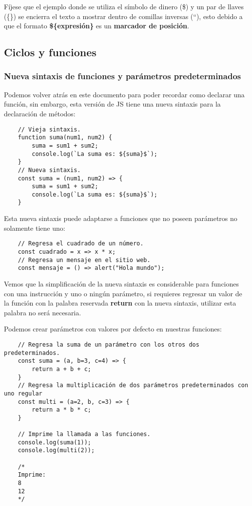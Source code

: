 Fíjese que el ejemplo donde se utiliza el símbolo de dinero (\$) y un par de llaves (\{\}) se encierra el texto a mostrar dentro de comillas inversas (``), esto debido a que el formato \textbf{\$\{expresión\}} es un \textbf{marcador de posición}.


\subsection{Ciclos y funciones}


\subsubsection{Nueva sintaxis de funciones y parámetros predeterminados}
\hspace{0.55cm}Podemos volver atrás en este documento para poder recordar como declarar una función, sin embargo, esta versión de JS tiene una nueva sintaxis para la declaración de métodos:
\begin{lstlisting}
    // Vieja sintaxis.
    function suma(num1, num2) {
        suma = sum1 + sum2;
        console.log(`La suma es: ${suma}$`);
    }
    // Nueva sintaxis.
    const suma = (num1, num2) => {
        suma = sum1 + sum2;
        console.log(`La suma es: ${suma}$`);
    }
\end{lstlisting}

Esta nueva sintaxis puede adaptarse a funciones que no poseen parámetros no solamente tiene uno:
\begin{lstlisting}
    // Regresa el cuadrado de un número.
    const cuadrado = x => x * x;
    // Regresa un mensaje en el sitio web.
    const mensaje = () => alert("Hola mundo");
\end{lstlisting}

Vemos que la simplificación de la nueva sintaxis es considerable para funciones con una instrucción y uno o ningún parámetro, si requieres regresar un valor de la función con la palabra reservada \textbf{return} con la nueva sintaxis, utilizar esta palabra no será necesaria.

Podemos crear parámetros con valores por defecto en nuestras funciones:
\begin{lstlisting}
    // Regresa la suma de un parámetro con los otros dos predeterminados.
    const suma = (a, b=3, c=4) => {
        return a + b + c;
    }
    // Regresa la multiplicación de dos parámetros predeterminados con uno regular
    const multi = (a=2, b, c=3) => {
        return a * b * c;
    }

    // Imprime la llamada a las funciones.
    console.log(suma(1));
    console.log(multi(2));

    /*
    Imprime:
    8
    12
    */
\end{lstlisting}


